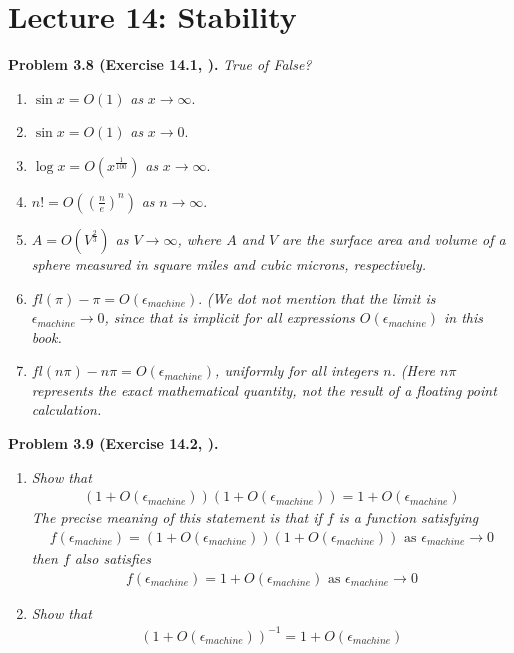 \documentclass[a4paper,oneside]{book}
\numberwithin{equation}{chapter}
\begin{document}
\section{Lecture 14: Stability}
\textbf{Problem 3.8 (Exercise 14.1, \cite{1}).} \textit{True of False?}
\begin{enumerate}
\item $\sin x = O\left( 1 \right)$ \textit{as} $x \to \infty $.
\item $\sin x = O\left( 1 \right)$ \textit{as} $x \to 0 $.
\item $\log x = O\left( {{x^{\frac{1}{{100}}}}} \right)$ \textit{as} $x \to \infty $.
\item $n! = O\left( {{{\left( {\frac{n}{e}} \right)}^n}} \right)$ \textit{as} $n \to \infty $.
\item \textit{$A = O\left( {{V^{\frac{2}{3}}}} \right)$ as $V \to \infty $, where $A$ and $V$ are the surface area and volume of a sphere measured in square miles and cubic microns, respectively.}
\item $fl\left( \pi  \right) - \pi  = O\left( {{\epsilon _{machine}}} \right)$. \textit{(We dot not mention that the limit is $\epsilon _{machine} \to 0$, since that is implicit for all expressions $O\left(\epsilon _{machine}\right)$ in this book.}
\item $fl\left( {n\pi } \right) - n\pi  = O\left( {{\epsilon _{machine}}} \right)$\textit{, uniformly for all integers $n$. (Here $n\pi$ represents the exact mathematical quantity, not the result of a floating point calculation.}
\end{enumerate}
\textbf{Problem 3.9 (Exercise 14.2, \cite{1}).}
\begin{enumerate}
\item \textit{Show that}
\begin{align}
\left( {1 + O\left( {{\epsilon _{machine}}} \right)} \right)\left( {1 + O\left( {{\epsilon _{machine}}} \right)} \right) = 1 + O\left( {{\epsilon _{machine}}} \right)
\end{align}
\textit{The precise meaning of this statement is that if $f$ is a function satisfying }
\begin{align}
f\left( {{\epsilon _{machine}}} \right) = \left( {1 + O\left( {{\epsilon _{machine}}} \right)} \right)\left( {1 + O\left( {{\epsilon _{machine}}} \right)} \right)\mbox{ as } {\epsilon _{machine}} \to 0
\end{align}
\textit{then $f$ also satisfies}
\begin{align}
f\left( {{\epsilon _{machine}}} \right) = 1 + O\left( {{\epsilon _{machine}}} \right)\mbox{ as } {\epsilon _{machine}} \to 0
\end{align}
\item \textit{Show that}
\begin{align}
{\left( {1 + O\left( {{\epsilon _{machine}}} \right)} \right)^{ - 1}} = 1 + O\left( {{\epsilon _{machine}}} \right)
\end{align}
\end{enumerate}
\end{document}
